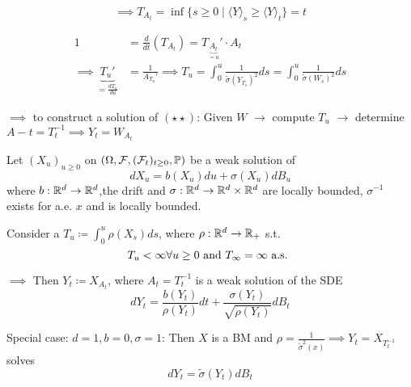 \[\implies T_{A_t}=\inf\{s\geq 0\mid \langle Y\rangle_s\geq \langle Y\rangle_t\}=t\]

\begin{align*}
    1&=\frac{d}{dt}\left(T_{A_t}\right)=T_{\underbrace{A_t}_{=u}}'\cdot A_t\\
    \implies \underbrace{T_u'}_{=\frac{dT_u}{du}}&=\frac{1}{A_{T_u}'} \implies T_u = \int_0^u \frac{1}{\tilde{\sigma}(Y_{T_s})^2}ds=\int_0^u \frac{1}{\tilde{\sigma}(W_s)^2}ds
\end{align*}

$\implies$ to construct a solution of $(\star\star)$: Given $W$ $\longrightarrow$ compute $T_u$ $\longrightarrow$ determine $A-t=T_t^{-1}\implies Y_t=W_{A_t}$


\begin{theorem}\label{thm:1.22}
    Let $(X_u)_{u\geq 0}$ on $(\Omega,\mathcal{F},(\mathcal{F}_t)_{t\geq 0},\mathbb{P})$ be a weak solution of 
    \[dX_u=b(X_u)du+\sigma(X_u)dB_u\]
    where $b:\mathbb{R}^d\to\mathbb{R}^d$,the drift and $\sigma:\mathbb{R}^d\to\mathbb{R}^d\times\mathbb{R}^d$ are locally bounded, 
    $\sigma^{-1}$ exists for a.e. $x$ and is locally bounded.
    
    Consider a  $T_u\coloneqq \int_0^u \rho(X_s)ds$,
    where $\rho:\mathbb{R}^d\to\mathbb{R}_+$ s.t. 
    \[T_u<\infty \forall u\geq 0\text{ and } T_\infty=\infty\text{ a.s. }\]

    $\implies$ Then $Y_t\coloneqq X_{A_t}$, where $A_t=T_t^{-1}$ is a weak 
    solution of the SDE 
    \[dY_t=\frac{b(Y_t)}{\rho(Y_t)}dt+\frac{\sigma(Y_t)}{\sqrt{\rho(Y_t)}}dB_t\]
\end{theorem}

\begin{remark}
    Special case: $d=1,b=0,\sigma=1$: Then $X$ is a BM and $\rho=\frac{1}{\tilde{\sigma}^2(x)}\implies Y_t=X_{T_t^{-1}}$ solves 
    \[dY_t=\tilde{\sigma}(Y_t)dB_t\]
\end{remark}


